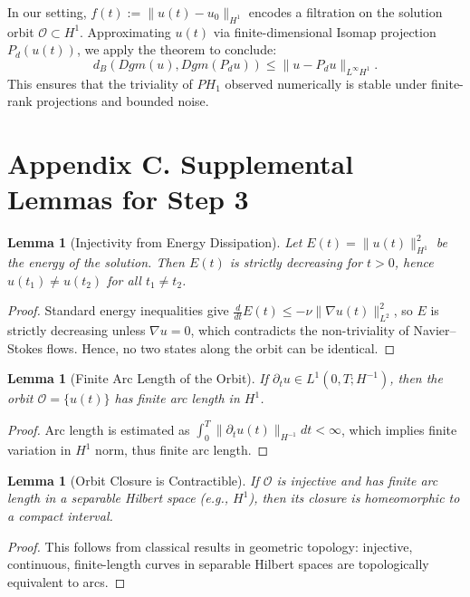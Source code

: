 \documentclass[11pt]{article}
\newtheorem{lemma}[theorem]{Lemma}
\theoremstyle{definition}
\begin{document}
\noindent In our setting, $f(t) := \|u(t) - u_0\|_{H^1}$ encodes a filtration on the solution orbit $\mathcal O \subset H^1$. Approximating $u(t)$ via finite-dimensional Isomap projection $P_d(u(t))$, we apply the theorem to conclude:
\[
d_B(Dgm(u), Dgm(P_d u)) \le \|u - P_d u\|_{L^\infty H^1}.
\]
This ensures that the triviality of $PH_1$ observed numerically is stable under finite-rank projections and bounded noise.

\section{Appendix C. Supplemental Lemmas for Step 3}
\label{sec:appendixC}

\begin{lemma}[Injectivity from Energy Dissipation]
Let $E(t) = \|u(t)\|_{H^1}^2$ be the energy of the solution. Then $E(t)$ is strictly decreasing for $t > 0$, hence $u(t_1) \ne u(t_2)$ for all $t_1 \ne t_2$.
\end{lemma}

\begin{proof}
Standard energy inequalities give $\frac{d}{dt} E(t) \le -\nu \|\nabla u(t)\|_{L^2}^2$, so $E$ is strictly decreasing unless $\nabla u = 0$, which contradicts the non-triviality of Navier--Stokes flows. Hence, no two states along the orbit can be identical.
\end{proof}

\begin{lemma}[Finite Arc Length of the Orbit]
If $\partial_t u \in L^1(0, T; H^{-1})$, then the orbit $\mathcal{O} = \{ u(t) \}$ has finite arc length in $H^1$.
\end{lemma}

\begin{proof}
Arc length is estimated as $\int_0^T \|\partial_t u(t)\|_{H^{-1}} dt < \infty$, which implies finite variation in $H^1$ norm, thus finite arc length.
\end{proof}

\begin{lemma}[Orbit Closure is Contractible]
If $\mathcal{O}$ is injective and has finite arc length in a separable Hilbert space (e.g., $H^1$), then its closure is homeomorphic to a compact interval.
\end{lemma}

\begin{proof}
This follows from classical results in geometric topology: injective, continuous, finite-length curves in separable Hilbert spaces are topologically equivalent to arcs.
\end{proof}
\end{document}
